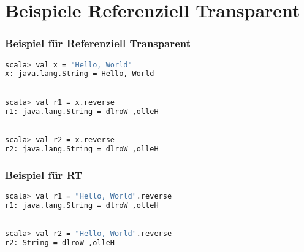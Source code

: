 	\section[Section]{Beispiele Referenziell Transparent}
	\begin{frame}[fragile]
		\frametitle{Beispiel für Referenziell Transparent}
		\begin{lstlisting}[language=bash]
scala> val x = "Hello, World"
x: java.lang.String = Hello, World 

		
scala> val r1 = x.reverse 
r1: java.lang.String = dlroW ,olleH 

		
scala> val r2 = x.reverse 
r2: java.lang.String = dlroW ,olleH 
\end{lstlisting}	
\end{frame}
	\begin{frame}[fragile]
		\frametitle{Beispiel für RT}
		\begin{lstlisting}[language=bash]
scala> val r1 = "Hello, World".reverse
r1: java.lang.String = dlroW ,olleH 

		
scala> val r2 = "Hello, World".reverse 
r2: String = dlroW ,olleH 
		
\end{lstlisting}
\end{frame}